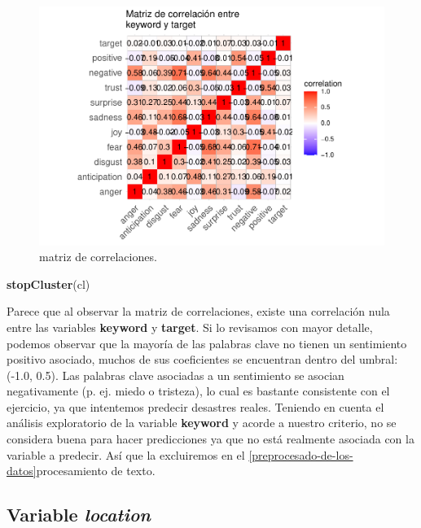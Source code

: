 \documentclass[]{article}
\newenvironment{Shaded}{\begin{snugshade}}{\end{snugshade}}
\newcommand{\KeywordTok}[1]{\textcolor[rgb]{0.13,0.29,0.53}{\textbf{#1}}}
\newcommand{\NormalTok}[1]{#1}
\begin{document}
\begin{figure}
	\begin{center}
		\includegraphics[width=1\linewidth]{document_files/figure-latex/unnamed-chunk-7-1} 
		\caption{matriz de correlaciones.}
		\label{fig: matriz de correlaciones}
	\end{center}
\end{figure}

\begin{Shaded}
\begin{Highlighting}[]
\KeywordTok{stopCluster}\NormalTok{(cl)}
\end{Highlighting}
\end{Shaded}

\newpage

Parece que al observar la matriz de correlaciones, existe una correlación nula entre las variables \textbf{keyword} y \textbf{target}. Si lo revisamos con mayor detalle, podemos observar que la mayoría de las
palabras clave no tienen un sentimiento positivo asociado, muchos de sus coeficientes se encuentran dentro del umbral: (-1.0, 0.5). Las palabras clave asociadas a un sentimiento se asocian negativamente (p. ej. miedo o
tristeza), lo cual es bastante consistente con el ejercicio, ya que intentemos predecir desastres reales. Teniendo en cuenta el análisis exploratorio de la variable \textbf{keyword} y acorde a nuestro criterio, no se considera buena para hacer predicciones ya que no está realmente asociada con la variable a
predecir. Así que la excluiremos en el \ref{preprocesado-de-los-datos}{procesamiento de texto}.

\hypertarget{variable-location}{%
\subsection{\texorpdfstring{Variable
\emph{location}}{Variable location}}\label{variable-location}}
\end{document}
